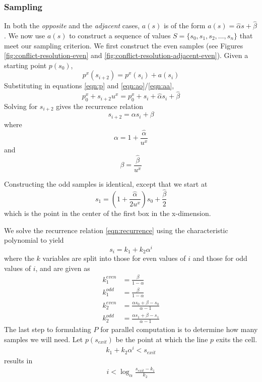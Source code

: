 \documentclass[submission]{gmp2017}
\begin{document}
\subsubsection{Sampling}
In both the \textit{opposite} and the \textit{adjacent} cases, $a(s)$ is of the form $a(s) = \hat{\alpha} s + \hat{\beta}$. We now use $a(s)$ to construct a sequence of values $S = \{s_0, s_1, s_2, \dots, s_n\}$ that meet our sampling criterion. We first construct the even samples (see Figures \ref{fig:conflict-resolution-even} and \ref{fig:conflict-resolution-adjacent-even}). Given a starting point $p(s_0)$,
\begin{equation}
p^x(s_{i+2}) = p^x(s_i) + a(s_i)
\end{equation}
Substituting in equations \eqref{eqn:p} and \eqref{eqn:ao}/\eqref{eqn:aa},
\begin{equation}
p_0^x + s_{i+2}u^x = p_0^x + s_i + \hat{\alpha} s_i + \hat{\beta}
\end{equation}
Solving for $s_{i+2}$ gives the recurrence relation
\begin{equation}
s_{i+2} = \alpha s_i + \beta \label{eqn:recurrence}
\end{equation}
where
\begin{equation}
\alpha = 1 + \frac{\hat{\alpha}}{u^x}
\end{equation}
and
\begin{equation}
\beta = \frac{\hat{\beta}}{u^x}
\end{equation}

Constructing the odd samples is identical, except that we start at
\begin{equation}
s_1 = \left(1+\frac{\hat{\alpha}}{2u^x}\right)s_0 + \frac{\hat{\beta}}{2}
\end{equation}
which is the point in the center of the first box in the x-dimension.

We solve the recurrence relation \eqref{eqn:recurrence} using the characteristic polynomial to yield
\begin{equation}
s_i = k_1 + k_2 \alpha^i \label{eqn:sample}
\end{equation}
where the $k$ variables are split into those for even values of $i$ and those for odd values of $i$, and are given as
\begin{align}
k_1^{even} &= \frac{\beta}{1-\alpha} \\
k_1^{odd} &= \frac{\beta}{1-\alpha} \\
k_2^{even} &= \frac{\alpha s_0 + \beta - s_0}{\alpha-1} \\
k_2^{odd} &= \frac{\alpha s_1 + \beta - s_1}{\alpha-1}
\end{align}
The last step to formulating $P$ for parallel computation is to determine how many samples we will need. Let $p(s_{exit})$ be the point at which the line $p$ exits the cell.
\begin{align}
k_1+k_2\alpha^i < s_{exit}
\end{align}
results in
\begin{align}
i < \log_{\alpha}\frac{s_{exit}-k_1}{k_2} \label{eqn:num-samples}
\end{align}
\end{document}
